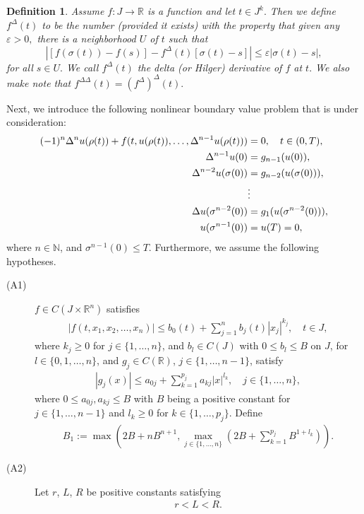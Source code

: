 \documentclass[reqno, 12pt]{amsart}
\newtheorem{definition}[theorem]{Definition}
\numberwithin{equation}{section}
\begin{document}
\begin{definition}
	Assume $f: J \rightarrow \mathbb{R}$ is a function and let $t \in J^k.$  Then we define $f^{\Delta}(t)$ to be the number (provided it exists) with the property that given any $\varepsilon > 0,$ there is a neighborhood $U$ of $t$ such that $$\left|[f(\sigma(t)) - f(s)] - f^{\Delta}(t)[\sigma(t) - s]\right| \leq \varepsilon |\sigma(t) - s|,$$ for all $s \in U.$  We call $f^{\Delta}(t)$ the delta (or Hilger) derivative of $f$ at $t.$  We also make note that $f^{\Delta \Delta}(t) = (f^{\Delta})^{\Delta}(t).$
\end{definition}
Next, we introduce the following nonlinear boundary value problem that is under consideration:
\begin{align}
\label{eq:main}
(-1)^n\Delta^nu(\rho(t)) + f(t, u(\rho(t)), \ldots, \Delta^{n-1}u(\rho(t))) &= 0, \quad t \in (0, T),\notag \\
\Delta^{n-1}u(0) &= g_{n-1}(u(0)), \notag\\
\Delta^{n-2}u(\sigma(0)) &= g_{n-2}(u(\sigma(0))), \notag\\
&\vdots \notag\\
\Delta u(\sigma^{n-2}(0)) &= g_1(u(\sigma^{n-2}(0))), \notag\\
u(\sigma^{n-1}(0)) &= u(T) = 0, 
\end{align}
where $n \in \mathbb{N}$, and $\sigma^{n-1}(0) \leq T$. Furthermore, we assume the following hypotheses.
\begin{description}
\item[(A1)]$f \in C(J \times \mathbb{R}^n)$ satisfies
\begin{align}
|f(t, x_1, x_2, \ldots, x_n)| \leq b_0(t) + \sum_{j=1}^{n} b_j(t)|x_j|^{k_j}, \quad t \in J, \label{eq:f-bound}
\end{align}
where $k_j \geq 0$ for $j \in \{1, \ldots, n\}$, and $b_l \in C(J)$ with $0 \leq b_l \leq B$ on $J$, for $l \in \{0, 1, \ldots, n\}$, and  $g_j \in C(\mathbb{R})$, $j \in \{1, \ldots, n-1\}$, satisfy
\begin{align}
|g_j(x)| \leq a_{0j} + \sum_{k=1}^{p_j} a_{kj}|x|^{l_k}, \quad j \in \{1, \ldots, n\}, \label{eq:g-bound}
\end{align}
where $0 \leq a_{0j}, a_{kj} \leq B$ with $B$ being a positive constant for $j \in \{1, \ldots, n-1\}$ and $l_k \geq 0$ for $k \in \{1, \ldots, p_j\}$. 
Define
\begin{align}
B_1 := \max\left(2B + nB^{n+1}, \max_{j\in\{1,\ldots,n\}}\left(2B + \sum_{k=1}^{p_j} B^{1+l_k}\right)\right). \label{eq:B1-def}
\end{align}
\item[(A2)] Let  $r$, $L$, $R$ be positive constants satisfying
\begin{align}
r < L < R. \label{eq:A2-cond}
\end{align}
\end{description}
\end{document}
